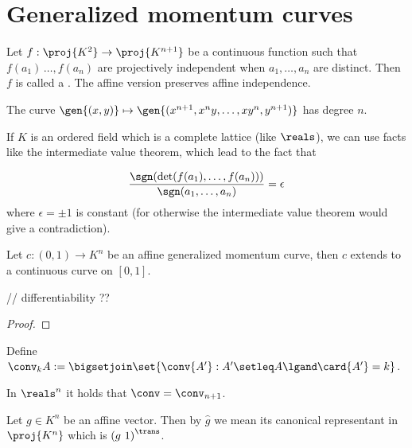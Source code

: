 
\section{Generalized momentum curves}

\begin{definition}
    Let $f:\proj{K^2}\to \proj{K^{n+1}}$ be a continuous function such that $f(a_1)\,\ldots,f(a_n)$ are projectively independent when $a_1,\ldots,a_n$ are distinct.
    Then $f$ is called a .
    The affine version preserves affine independence.
\end{definition}

\begin{example}
    The curve $\gen{(x,y)}\mapsto\gen{(x^{n+1},x^ny,\ldots,xy^n,y^{n+1})}$ has degree $n$.
\end{example}

    If $K$ is an ordered field which is a complete lattice (like $\reals$), we can use facts like the intermediate value theorem, which lead to the fact that

    $$
    \frac{\sgn(\det(f(a_1),\ldots,f(a_n)))}{\sgn(a_1,\ldots,a_n)}=\epsilon
    $$
where $\epsilon=\pm 1$ is constant (for otherwise the intermediate value theorem would give a contradiction).

\begin{lemma}
    Let $c:(0,1)\to K^n$ be an affine generalized momentum curve, then $c$ extends to a continuous curve on $[0,1]$.
\end{lemma}

// differentiability ??

\begin{proof}

\end{proof}


\begin{definition}
    Define $\conv_k{A}:=\bigsetjoin\set{\conv{A'}:A'\setleq A\lgand \card{A'}=k}$.
\end{definition}

\begin{theorem}
    In $\reals^n$ it holds that $\conv=\conv_{n+1}$.
\end{theorem}

\begin{definition}
    Let $g\in K^n$ be an affine vector. Then by $\hat{g}$ we mean its canonical representant in $\proj{K^n}$ which is ${(g\ 1)}^{\trans}$. 
\end{definition}


